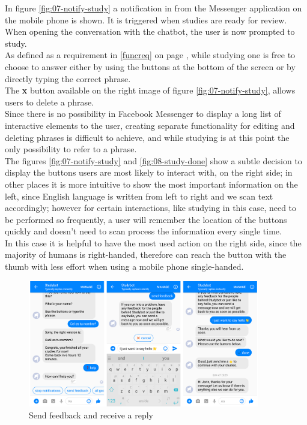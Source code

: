 In figure \ref{fig:07-notify-study} a notification in from the Messenger application on the mobile phone is shown.
It is triggered when studies are ready for review.
\\
When opening the conversation with the chatbot,
the user is now prompted to study.
\\
As defined as a requirement in \ref{funcreq} on page \pageref{funcreq},
while studying one is free to choose to answer either by using the buttons at the bottom of the screen
or by directly typing the correct phrase.
\\

The \textbf{x} button available on the right image of figure \ref{fig:07-notify-study},
allows users to delete a phrase.
\\
Since there is no possibility in Facebook Messenger to display a long list of interactive elements to the user,
creating separate functionality for editing and deleting phrases is difficult to achieve,
and while studying is at this point the only possibility to refer to a phrase.
\\

The figures \ref{fig:07-notify-study} and \ref{fig:08-study-done} show a subtle decision to display the buttons users are most likely to interact with,
on the right side;
in other places it is more intuitive to show the most important information on the left,
since English language is written from left to right and we scan text accordingly;
however for certain interactions, like studying in this case, need to be performed so frequently,
a user will remember the location of the buttons quickly and doesn't need to scan process the information every single time.
\\
In this case it is helpful to have the most used action on the right side, since the majority of humans is right-handed,
therefore can reach the button with the thumb with less effort when using a mobile phone single-handed.
\\

\begin{figure}[h]
  \centering
  \includegraphics[width=0.9\textwidth]{images/interface/09-feedback.png}
	\caption{Send feedback and receive a reply}
	\label{fig:09-feedback}
\end{figure}

